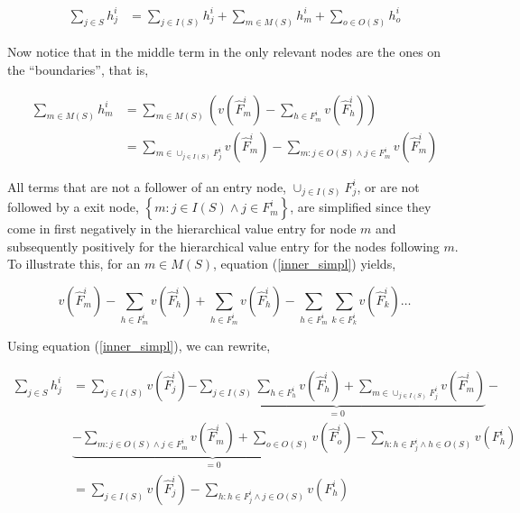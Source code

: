 \documentclass[american]{scrartcl}
\newcommand{\set}[1]{\left\{#1\right\}}
\begin{document}
\begin{equation}
    \begin{split}
        \sum_{j \in S} h_j^i &= \sum_{j \in I(S)} h_j^i + \sum_{m \in M(S)} h_m^i + \sum_{o \in O(S)} h_o^i
    \end{split}
\end{equation}

Now notice that in the middle term in the only relevant nodes are the ones on the ``boundaries'', that is,

\begin{equation} \label{inner_simpl}
    \begin{split}
        \sum_{m \in M(S)} h_m^i &= \sum_{m \in M(S)} \left( v(\hat{F}^i_m) - \sum_{h \in F^i_m}  v(\hat{F}^i_h) \right) \\
        &= \sum_{m \in \cup_{j \in I(S)} F^i_j} v(\hat{F}^i_m) - \sum_{m: j \in O(S) \land j \in F^i_m} v(\hat{F}^i_m)
    \end{split}
\end{equation}

All terms that are not a follower of an entry node, $\cup_{j \in I(S)} F_j^i$, or are not followed by a exit node, $\set{m: j \in I(S) \land j \in F^i_m}$, are simplified since they come in first negatively in the hierarchical value entry for node $m$ and subsequently positively for the hierarchical value entry for the nodes following $m$. To illustrate this, for an $m \in M(S)$, equation (\ref{inner_simpl}) yields,

\begin{equation}
    v(\hat{F}_m^i) - \sum_{h \in F^i_m} v(\hat{F}_h^i) + \sum_{h \in F^i_m} v(\hat{F}_h^i) - \sum_{h \in F^i_m} \sum_{k \in F^i_k} v(\hat{F}_k^i) \ldots
\end{equation}

Using equation (\ref{inner_simpl}), we can rewrite,

\begin{equation} \label{component_breakup}
    \begin{split}
        \sum_{j \in S} h_j^i &= \sum_{j \in I(S)} v(\hat{F}_j^i) \underbrace{- \sum_{j \in I(S)} \sum_{h \in F_h^i}  v(\hat{F}_h^i)+
            \sum_{m \in \cup_{j \in I(S)} F^i_j} v(\hat{F}^i_m)}_{= 0} - \\ & \underbrace{- \sum_{m: j \in O(S) \land j \in F^i_m} v(\hat{F}^i_m)
            + \sum_{o \in O(S)} v(\hat{F}^i_o)}_{=0} - \sum_{h: h \in F_j^i \land h \in O(S)} v(F^i_h) \\
        &= \sum_{j \in I(S)} v(\hat{F}_j^i) - \sum_{h: h \in F_j^i \land j \in O(S)} v(F^i_h)
    \end{split}
\end{equation}
\end{document}
